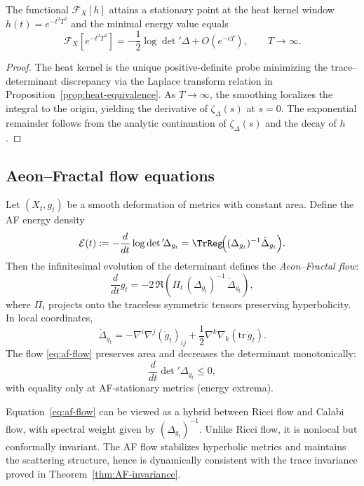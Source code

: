 \begin{theorem}\label{thm:energy-min}
The functional $\mathcal{F}_X[h]$ attains a stationary point at the heat
kernel window $h(t)=e^{-t^2T^2}$ and the minimal energy value equals
\[
\mathcal{F}_X[e^{-t^2T^2}]
= -\frac{1}{2}\log\det{}'\!\Delta + O(e^{-cT}),
\qquad T\to\infty.
\]
\end{theorem}

\begin{proof}
The heat kernel is the unique positive-definite probe minimizing the
trace–determinant discrepancy via the Laplace transform relation in
Proposition~\ref{prop:heat-equivalence}. As $T\to\infty$, the smoothing
localizes the integral to the origin, yielding the derivative of
$\zeta_\Delta(s)$ at $s=0$. The exponential remainder follows from the
analytic continuation of $\zeta_\Delta(s)$ and the decay of $h$.         %
\end{proof}

\subsection{Aeon–Fractal flow equations}
\label{subsec:af-flow}
\relax\hspace{0pt}

Let $(X_t,g_t)$ be a smooth deformation of metrics with constant area.
Define the AF energy density
\[
\mathcal{E}(t)
:= -\frac{d}{dt}\log\det{}'\!\Delta_{g_t}
= \TrReg\!\Big((\Delta_{g_t})^{-1}\dot{\Delta}_{g_t}\Big).
\]
Then the infinitesimal evolution of the determinant defines the
\emph{Aeon–Fractal flow}:
\begin{equation}\label{eq:af-flow}
\frac{d}{dt}g_t
=-2\,\Re\!\left(\Pi_t\,(\Delta_{g_t})^{-1}\,\dot{\Delta}_{g_t}\right),
\end{equation}
where $\Pi_t$ projects onto the traceless symmetric tensors preserving
hyperbolicity. In local coordinates,
\[
\dot{\Delta}_{g_t}
=-\nabla^i\nabla^j(\dot{g}_{t})_{ij}
+\frac12 \nabla^k\nabla_k(\mathrm{tr}\,\dot{g}_t).
\]
The flow \eqref{eq:af-flow} preserves area and decreases the determinant
monotonically:
\[
\frac{d}{dt}\det{}'\!\Delta_{g_t}\le 0,
\]
with equality only at AF-stationary metrics (energy extrema).            %

\begin{remark}\label{rem:flows}
Equation~\eqref{eq:af-flow} can be viewed as a hybrid between Ricci flow
and Calabi flow, with spectral weight given by $(\Delta_{g_t})^{-1}$.
Unlike Ricci flow, it is nonlocal but conformally invariant. The AF
flow stabilizes hyperbolic metrics and maintains the scattering
structure, hence is dynamically consistent with the trace invariance
proved in Theorem~\ref{thm:AF-invariance}.                              %
\end{remark}

